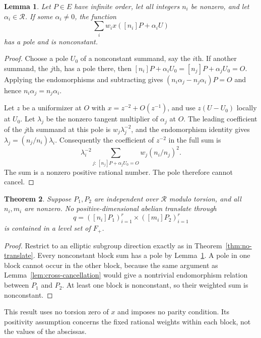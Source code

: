 \documentclass[11pt,a4paper]{article}
\newtheorem{theorem}{Theorem}
\newtheorem{lemma}[theorem]{Lemma}
\begin{document}
\begin{lemma}\label{lem:sum-poles}
Let $P\in E$ have infinite order, let all integers $n_i$ be
nonzero, and let $\alpha_i\in\mathcal R$. If some
$\alpha_i\ne0$, the function
\[
 \sum_i w_i x([n_i]P+\alpha_iU)
\]
has a pole and is nonconstant.
\end{lemma}
\begin{proof}
Choose a pole $U_0$ of a nonconstant summand, say the $i$th.
If another summand, the $j$th, has a pole there, then
$[n_i]P+\alpha_iU_0=[n_j]P+\alpha_jU_0=O$.
Applying the endomorphisms and subtracting gives
$(n_i\alpha_j-n_j\alpha_i)P=O$ and hence
$n_i\alpha_j=n_j\alpha_i$.

Let $z$ be a uniformizer at $O$ with
$x=z^{-2}+O(z^{-1})$, and use $z(U-U_0)$ locally at $U_0$.
Let $\lambda_j$ be the nonzero tangent multiplier of
$\alpha_j$ at $O$. The leading coefficient of the $j$th
summand at this pole is $w_j\lambda_j^{-2}$, and the
endomorphism identity gives
$\lambda_j=(n_j/n_i)\lambda_i$. Consequently the coefficient
of $z^{-2}$ in the full sum is
\[
 \lambda_i^{-2}
       \sum_{j:\,[n_j]P+\alpha_jU_0=O}
                    w_j(n_i/n_j)^2.
\]
The sum is a nonzero positive rational number. The pole
therefore cannot cancel.
\end{proof}

\begin{theorem}\label{thm:sum-no-translate}
Suppose $P_1,P_2$ are independent over $\mathcal R$ modulo
torsion, and all $n_i,m_i$ are nonzero. No
positive-dimensional abelian translate through
\[
 q=([n_i]P_1)_{i=1}^r\times([m_i]P_2)_{i=1}^r
\]
is contained in a level set of $F_+$.
\end{theorem}
\begin{proof}
Restrict to an elliptic subgroup direction exactly as in
Theorem~\ref{thm:no-translate}. Every nonconstant block sum
has a pole by Lemma~\ref{lem:sum-poles}. A pole in one block
cannot occur in the other block, because the same argument
as Lemma~\ref{lem:cross-cancellation} would give a nontrivial
endomorphism relation between $P_1$ and $P_2$. At least one
block is nonconstant, so their weighted sum is nonconstant.
\end{proof}

This result uses no torsion zero of $x$ and imposes no parity
condition. Its positivity assumption concerns the fixed
rational weights within each block, not the values of the
abscissas.
\end{document}
